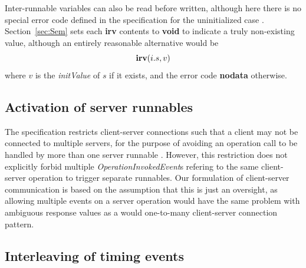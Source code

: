 \documentclass[10pt,conference]{IEEEtran}
\begin{document}
Inter-runnable variables can also be read before written, although here there is no special error code defined in the specification for the uninitialized case \cite[ch.~5.6.26]{AR:RTE}. Section~\ref{sec:Sem} sets each {\bf irv} contents to {\bf void} to indicate a truly non-existing value, although an entirely reasonable alternative would be
$$
  \textbf{irv}(i.s,v)
$$
where $v$ is the \emph{initValue} of $s$ if it exists, and the error code {\bf nodata} otherwise.


\subsection{Activation of server runnables}

The specification restricts client-server connections such that a client may not be connected to multiple servers, for the purpose of avoiding an operation call to be handled by more than one server runnable \cite[ch.~4.2.3]{AR:RTE}. However, this restriction does not explicitly forbid multiple \emph{Operation\-InvokedEvent}s refering to the same client-server operation to trigger separate runnables. Our formulation of client-server communication is based on the assumption that this is just an oversight, as allowing multiple events on a server operation would have the same problem with ambiguous response values as a would one-to-many client-server connection pattern. %


\subsection{Interleaving of timing events}
\end{document}
